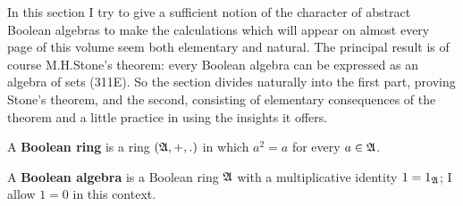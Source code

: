  
\def\chaptername{Boolean algebras} 
\def\sectionname{Boolean algebras} 
 
 
In this section I try to give a sufficient notion of the character of 
abstract Boolean algebras to make the calculations which will appear on 
almost every page of this volume seem both elementary and natural. 
The principal result is of course M.H.Stone's theorem:  every Boolean 
algebra can be expressed as an algebra of sets (311E).   So the section 
divides naturally into the first part, proving Stone's theorem, and the 
second, consisting of elementary consequences of the theorem and a 
little practice in using the insights it offers. 
 
 A {\bf Boolean ring} is a ring 
$(\frak A,+,.)$ in which $a^2=a$ for every $a\in\frak A$. 
 
 A {\bf Boolean algebra} is a Boolean ring 
$\frak A$ with a multiplicative identity $1=1_{\frak A}$;  I allow $1=0$ 
in this context. 
 
 
